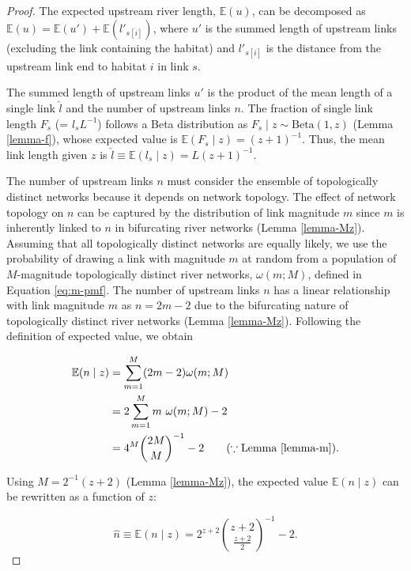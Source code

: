 \documentclass[11pt, class=article, crop=false]{standalone}
\theoremstyle{definition}
\begin{document}
\begin{proof}
The expected upstream river length, $\mathbb{E}(u)$, can be decomposed as $\mathbb{E}(u) = \mathbb{E}(u') + \mathbb{E}(l'_{s[i]})$, where $u'$ is the summed length of upstream links (excluding the link containing the habitat) and $l'_{s[i]}$ is the distance from the upstream link end to habitat $i$ in link $s$.

The summed length of upstream links $u'$ is the product of the mean length of a single link $\hat{l}$ and the number of upstream links $n$.
The fraction of single link length $F_s$ (= $l_s L^{-1}$) follows a Beta distribution as $F_s \mid z \sim \mathrm{Beta}(1, z)$ (Lemma \ref{lemma-f}),  whose expected value is $\mathbb{E}(F_s\mid z) = (z + 1)^{-1}$.
Thus, the mean link length given $z$ is $\hat{l} \equiv \mathbb{E}(l_s\mid z) = L(z + 1)^{-1}$.

The number of upstream links $n$ must consider the ensemble of topologically distinct networks because it depends on network topology.
The effect of network topology on $n$ can be captured by the distribution of link magnitude $m$ since $m$ is inherently linked to $n$ in bifurcating river networks (Lemma \ref{lemma-Mz}).
Assuming that all topologically distinct networks are equally likely, 
we use the probability of drawing a link with magnitude $m$ at random from a population of $M$-magnitude topologically distinct river networks, $\omega(m; M)$, defined in Equation \ref{eq:m-pmf}.
The number of upstream links $n$ has a linear relationship with link magnitude $m$ as $n = 2m - 2$ due to the bifurcating nature of topologically distinct river networks (Lemma \ref{lemma-Mz}).
Following the definition of expected value, we obtain

\begin{align}
    \begin{split}
    \mathbb{E}(n\mid z) 
        &= \sum_{m=1}^{M} (2m - 2) \omega(m; M)\\
        &= 2 \sum_{m=1}^{M} m~\omega(m; M) - 2\\
        &= 4^{M} \binom{2M}{M}^{-1} - 2
            \qquad 
            (\because \text{Lemma \ref{lemma-m}}).
    \end{split}
    \label{eq:n-hat}
\end{align}

Using $M = 2^{-1}(z + 2)$ (Lemma \ref{lemma-Mz}), the expected value $\mathbb{E}(n\mid z)$ can be rewritten as a function of $z$:

\begin{equation}
    \hat{n}
    \equiv \mathbb{E}(n\mid z)
    = 2^{z + 2} \binom{z + 2}{\frac{z + 2}{2}}^{-1} - 2.
\end{equation}


\end{proof}
\end{document}
